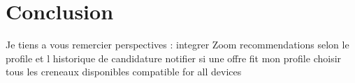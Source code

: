 \chapter*{Conclusion}
Je tiens a vous remercier 
perspectives :
integrer Zoom
recommendations selon le profile et l historique de candidature
notifier si une offre fit mon profile
choisir tous les creneaux disponibles
compatible for all devices 